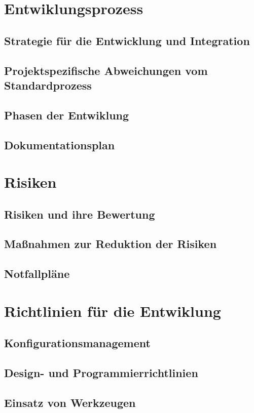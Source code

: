 \documentclass[a4paper,10pt]{scrartcl}
\begin{document}
\section{Entwiklungsprozess}
\subsection{Strategie für die Entwicklung und Integration}
\subsection{Projektspezifische Abweichungen vom Standardprozess}
\subsection{Phasen der Entwiklung}
\subsection{Dokumentationsplan}


\section{Risiken}
\subsection{Risiken und ihre Bewertung}
\subsection{Maßnahmen zur Reduktion der Risiken}
\subsection{Notfallpläne}


\section{Richtlinien für die Entwiklung}
\subsection{Konfigurationsmanagement}
\subsection{Design- und Programmierrichtlinien}
\subsection{Einsatz von Werkzeugen}
\end{document}
